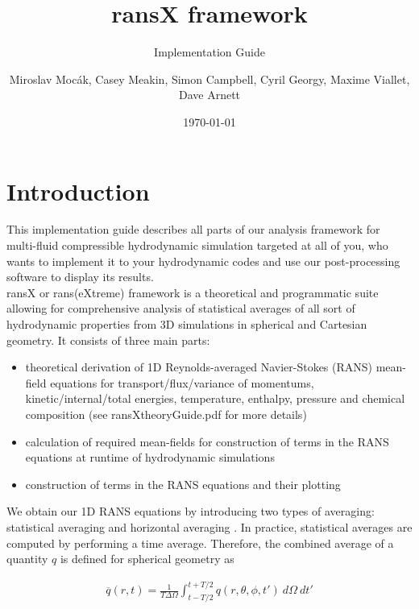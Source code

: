 \documentclass[11pt,paper=a4]{report}
\title{{\bf ransX framework}}
\subtitle{Implementation Guide}
\author{
        Miroslav Moc\'ak, Casey Meakin, Simon Campbell, Cyril Georgy, Maxime Viallet, Dave Arnett
}
\date{\today}
\newcommand{\eht}{\overline}
\begin{document}

\maketitle

\tableofcontents

\newpage

\section{Introduction}

This implementation guide describes all parts of our analysis framework for multi-fluid compressible hydrodynamic simulation targeted at all of you, who wants to implement it to your hydrodynamic codes and use our post-processing software to display its results.\\

ransX or rans(eXtreme) framework is a theoretical and programmatic suite allowing for comprehensive analysis of statistical averages of all sort of hydrodynamic properties from 3D simulations in spherical and Cartesian geometry. It consists of three main parts:

\begin{itemize}
\item theoretical derivation of 1D Reynolds-averaged Navier-Stokes (RANS) mean-field equations for transport/flux/variance of momentums, kinetic/internal/total energies, temperature, enthalpy, pressure and chemical composition (see ransXtheoryGuide.pdf for more details)
\item calculation of required mean-fields for construction of terms in the RANS equations at runtime of hydrodynamic simulations
\item construction of terms in the RANS equations and their plotting  
\end{itemize}

\par We obtain our 1D RANS equations by introducing two types of averaging:  statistical averaging and  horizontal averaging \citep{Besnard1992,VialletMeakin2013}. In practice, statistical averages are computed by performing a time average. Therefore, the combined average of a quantity $q$ is defined for spherical geometry as

\begin{align}\label{eq:eht}
\eht{q}(r,t) = \frac{1}{T\Delta\Omega}\int_{t- T/2}^{t+T/2} q(r,\theta,\phi,t')~d\Omega~dt'
\end{align}
\end{document}

